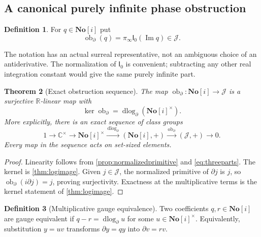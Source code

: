 \documentclass[11pt,a4paper]{article}
\newtheorem{theorem}{Theorem}[section]
\theoremstyle{definition}
\newtheorem{definition}[theorem]{Definition}
\newcommand{\SC}{\mathbf{No}[i]}
\newcommand{\R}{\mathbb R}
\newcommand{\C}{\mathbb C}
\newcommand{\D}{\partial}
\newcommand{\JJ}{\mathcal J}
\newcommand{\dlog}{\operatorname{dlog}_{\D}}
\newcommand{\Ob}{\operatorname{ob}_{\D}}
\newcommand{\Ip}{\mathsf I_0}
\newcommand{\pinf}{\pi_{\infty}}
\newcommand{\Imag}{\operatorname{Im}}
\DeclareMathOperator{\Ker}{ker}
\numberwithin{equation}{section}
\begin{document}
\subsection{A canonical purely infinite phase obstruction}
\begin{definition}\label{def:obstruction}
For $q\in\SC$ put
\begin{equation}\label{eq:obstruction}
 \Ob(q)=\pinf\Ip(\Imag q)\in\JJ.
\end{equation}
\end{definition}
The notation has an actual surreal representative, not an ambiguous
choice of an antiderivative. The normalization of $\Ip$ is convenient;
subtracting any other real integration constant would give the same
purely infinite part.

\begin{theorem}[Exact obstruction sequence]\label{thm:obstruction}
The map $\Ob:\SC\to\JJ$ is a surjective $\R$-linear map with
\[
 \Ker\Ob=\dlog(\SC^\times).
\]
More explicitly, there is an exact sequence of class groups
\begin{equation}\label{eq:exactsequence}
 1\longrightarrow\C^\times\longrightarrow\SC^\times
 \xrightarrow{\,\dlog\,}(\SC,+)
 \xrightarrow{\,\Ob\,}(\JJ,+)\longrightarrow0.
\end{equation}
Every map in the sequence acts on set-sized elements.
\end{theorem}
\begin{proof}
Linearity follows from \cref{prop:normalizedprimitive} and
\eqref{eq:threeparts}. The kernel is \cref{thm:logimage}. Given
$j\in\JJ$, the normalized primitive of $\D j$ is $j$, so
$\Ob(i\D j)=j$, proving surjectivity. Exactness at the multiplicative
terms is the kernel statement of \cref{thm:logimage}.
\end{proof}

\begin{definition}[Multiplicative gauge equivalence]
Two coefficients $q,r\in\SC$ are gauge equivalent if
$q-r=\dlog u$ for some $u\in\SC^\times$. Equivalently, substitution
$y=uv$ transforms $\D y=qy$ into $\D v=rv$.
\end{definition}
\end{document}
